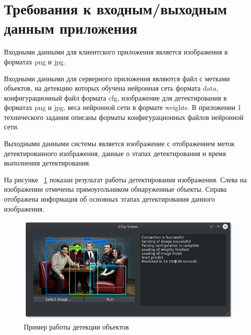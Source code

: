 \documentclass[a4paper,english,russian]{G2-105}
\begin{document}
\section{Требования к входным/выходным данным приложения}
\par Входными данными для клиентского приложения является изображения в форматах png и jpg.
\par Входными данными для серверного приложения являются файл с метками объектов, на детекцию которых обучена нейронная сеть формата data, конфигурационный файл формата cfg, изображение для детектирования в форматах png и jpg, веса нейронной сети в формате weights. В приложении 1 технического задания описаны форматы конфигурационных файлов нейронной сети.
\par Выходными данными системы является изображение с отображением меток детектированного изображения, данные о этапах детектирования и время выполнения детектирования.
\par На рисунке ~\ref{window} показан результат работы детектирования изображения. Слева на изображении отмечены прямоугольником обнаруженные объекты. Справа отображена информация об основных этапах детектирования данного изображения.
\begin{figure}
    \includegraphics[width=\linewidth]{window.png}
    \caption{Пример работы детекции объектов}
	\label{window}
\end{figure}
\ttl
\end{document}
